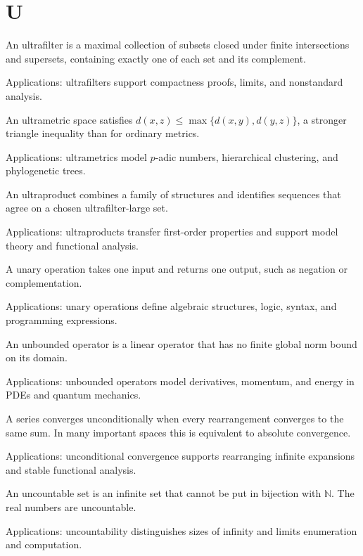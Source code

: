 \chapter*{U}
\label{chap:u}

An ultrafilter is a maximal collection of subsets closed under finite intersections and supersets, containing exactly one of each set and its complement. \par\noindent Applications: ultrafilters support compactness proofs, limits, and nonstandard analysis.

An ultrametric space satisfies $d(x,z)\leq\max\{d(x,y),d(y,z)\}$, a stronger triangle inequality than for ordinary metrics. \par\noindent Applications: ultrametrics model $p$-adic numbers, hierarchical clustering, and phylogenetic trees.

An ultraproduct combines a family of structures and identifies sequences that agree on a chosen ultrafilter-large set. \par\noindent Applications: ultraproducts transfer first-order properties and support model theory and functional analysis.

A unary operation takes one input and returns one output, such as negation or complementation. \par\noindent Applications: unary operations define algebraic structures, logic, syntax, and programming expressions.

An unbounded operator is a linear operator that has no finite global norm bound on its domain. \par\noindent Applications: unbounded operators model derivatives, momentum, and energy in PDEs and quantum mechanics.

A series converges unconditionally when every rearrangement converges to the same sum. In many important spaces this is equivalent to absolute convergence. \par\noindent Applications: unconditional convergence supports rearranging infinite expansions and stable functional analysis.

An uncountable set is an infinite set that cannot be put in bijection with $\mathbb N$. The real numbers are uncountable. \par\noindent Applications: uncountability distinguishes sizes of infinity and limits enumeration and computation.


